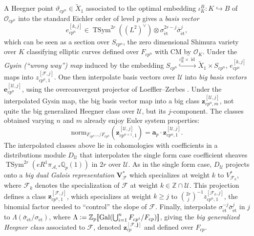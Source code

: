 \documentclass[a4paper]{amsart}
\numberwithin{equation}{section}
\theoremstyle{definition}
\newcommand{\Q}{\mathbb{Q}}
\newcommand{\Z}{\mathbb{Z}}
\newcommand{\defeq}{\vcentcolon=}
\DeclareMathOperator{\id}{id}
\DeclareMathOperator{\et}{\text{\'et}}
\DeclareMathOperator{\TSym}{TSym}
\newcommand{\norm}{\mathrm{norm}}
\renewcommand{\et}{\mathrm{\acute{e}t}}
\begin{document}
A Heegner point $\vartheta_{cp^n}\in \widetilde{X}_1$ associated to the optimal embedding $\iota_K^B\colon K\hookrightarrow B$ of $\mathcal{O}_{cp^n}$ into the standard Eichler order of level $p$ gives a \textit{basis vector} \[e_{cp^n}^{[k,j]}\in\TSym^{2r}((L^2)^\vee)\otimes \sigma_{\et}^{2r-j}\bar\sigma_{\et}^j,\] which can be seen as a section over $S_{cp^n}$, the zero dimensional Shimura variety over $K$ classifying elliptic curves defined over $F_{cp^n}$ with CM by $\mathcal{O}_K$. Under the \textit{Gysin (``wrong way'') map} induced by the embedding $S_{cp^n}\stackrel{\iota_K^B\times\id}{\hookrightarrow} \widetilde{X}_1\times S_{cp^n}$, $e_{cp^n}^{[k,j]}$ maps into $z_{cp^n,1}^{[\mathcal{F},j]}$. One then interpolate basis vectors over $\mathscr{U}$ into \textit{big basis vectors} $\mathbf{e}^{[\mathscr{U},j]}_{cp^n}$, using the overconvergent projector of Loeffler--Zerbes \cite{LoefflerZerbes.Rankin}. Under the interpolated Gysin map, the big basis vector map into a big class $\mathbf{z}^{[\mathscr{U}, j]}_{cp^n,m}$, not quite the big generalized Heegner class over $\mathscr{U}$, but its $j$-component. The classes obtained varying $n$ and $m$ already enjoy Euler system properties:
\begin{equation}
\norm_{F_{cp^{n+1}}/F_{cp^{n}}}\left(\mathbf{z}^{[\mathscr{U},j]}_{cp^{n+1},1}\right)=\mathbf{a}_p\cdot\mathbf{z}^{[\mathscr{U},j]}_{cp^n,1}.
\end{equation}
The interpolated classes above lie in cohomologies with coefficients in a distributions module $D_\mathscr{U}$ that interpolates the single form case coefficient sheaves $\TSym^{2r}(eR^1\pi_{\mathcal{A},\ast}\Q_p(1))$ in $2r$ over $\mathscr{U}$. As in the single form case, $D_\mathscr{U}$ projects onto a \textit{big dual Galois representation} $\mathbf{V}_{\mathscr{F}}^*$ which specializes at weight $k$ to $V_{\mathcal{F}_k}^*$, where $\mathcal{F}_k$ denotes the specialization of $\mathscr{F}$ at weight $k\in\Z\cap\mathscr{U}$. This projection defines a class $\mathbf{z}^{[\mathscr{F},j]}_{cp^n,1}$, which specializes at weight $k\ge j$ to $\binom{2r}{j}^{-1}z^{[\mathcal{F}_k,j]}_{cp^n,1}$, the binomial factor needed to ``control'' the slope of $\mathscr{F}$. Finally, interpolate $\sigma_{\et}^{-j}\bar{\sigma}_{\et}^j$ in $j$ to $\Lambda(\bar{\sigma}_{\et}/\sigma_{\et})$, where $\Lambda\defeq\Z_p[\![\operatorname{Gal}(\bigcup_{i=1}^n F_{cp^i}/F_{cp})]\!]$, giving the \textit{big generalized Heegner class} associated to $\mathscr{F}$, denoted $\mathbf{z}^{[\mathscr{F},\mathbf{j}]}_{cp}$ and defined over $F_{cp}$.
\end{document}
